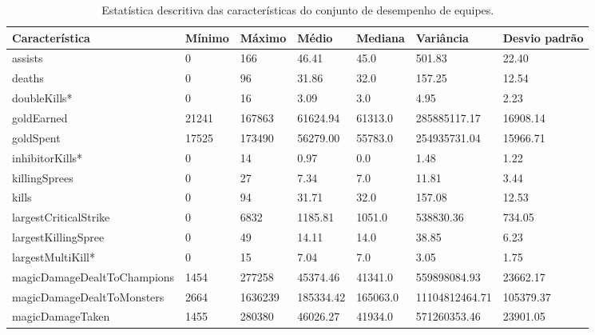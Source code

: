 \begin{table}
  \scriptsize
  \caption{Estatística descritiva das características do conjunto de desempenho de equipes.}
  \label{tab:descriptive-statistics}
  \begin{tabular}{p{}p{}p{}p{}p{}p{}p{}}
  \toprule
\textbf{Característica}&                   \textbf{Mínimo}&      \textbf{Máximo}&      \textbf{Médio}&      \textbf{Mediana}&      \textbf{Variância}&      \textbf{Desvio padrão} \\
  \midrule
assists&                             0&     166&     46.41&     45.0&         501.83&     22.40\\ \hline
deaths&                              0&      96&     31.86&     32.0&         157.25&     12.54\\ \hline
doubleKills*&                         0&      16&      3.09&      3.0&           4.95&      2.23\\ \hline
goldEarned&                      21241&  167863&  61624.94&  61313.0&   285885117.17&  16908.14\\ \hline
goldSpent&                       17525&  173490&  56279.00&  55783.0&   254935731.04&  15966.71\\ \hline
inhibitorKills*&                      0&      14&      0.97&      0.0&           1.48&      1.22\\ \hline
killingSprees&                       0&      27&      7.34&      7.0&          11.81&      3.44\\ \hline
kills&                               0&      94&     31.71&     32.0&         157.08&     12.53\\ \hline
largestCriticalStrike&               0&    6832&   1185.81&   1051.0&      538830.36&    734.05\\ \hline
largestKillingSpree&                 0&      49&     14.11&     14.0&          38.85&      6.23\\ \hline
largestMultiKill*&                    0&      15&      7.04&      7.0&           3.05&      1.75\\ \hline
magicDamageDealtToChampions&      1454&  277258&  45374.46&  41341.0&   559898084.93&  23662.17\\ \hline
magicDamageDealtToMonsters&       2664& 1636239& 185334.42& 165063.0& 11104812464.71& 105379.37\\ \hline
magicDamageTaken&                 1455&  280380&  46026.27&  41934.0&   571260353.46&  23901.05\\ \hline

\end{tabular}
\end{table}
